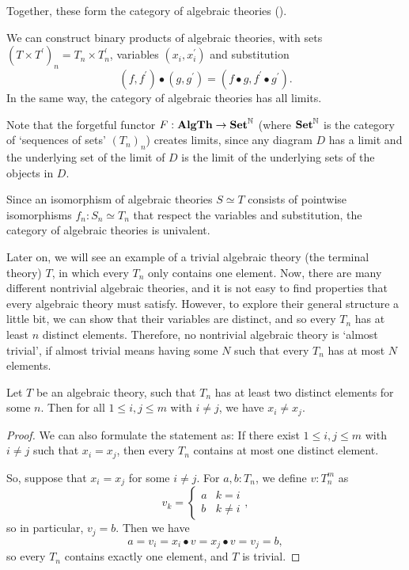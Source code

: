 Together, these form the category of algebraic theories \iindex{$ \AlgTh $} ().

\begin{lemma}\label{rem:algebraic-theory-limits}
  We can construct binary products of algebraic theories, with sets $ (T \times T^\prime)_n = T_n \times T^\prime_n $, variables $ (x_i, x^\prime_i) $ and substitution
  \[ (f, f^\prime) \bullet (g, g^\prime) = (f \bullet g, f^\prime \bullet g^\prime). \]
  In the same way, the category of algebraic theories has all limits.

  Note that the forgetful functor $ F: \mathbf{AlgTh} \to \mathbf{Set}^{\mathbb N} $ (where $ \mathbf{Set}^{\mathbb N} $ is the category of `sequences of sets' $ (T_n)_n $) creates limits, since any diagram $ D $ has a limit and the underlying set of the limit of $ D $ is the limit of the underlying sets of the objects in $ D $.
\end{lemma}

\begin{lemma}
  Since an isomorphism of algebraic theories $ S \simeq T $ consists of pointwise isomorphisms $ f_n: S_n \simeq T_n $ that respect the variables and substitution, the category of algebraic theories is univalent.
\end{lemma}

Later on, we will see an example of a trivial algebraic theory (the terminal theory) $ T $, in which every $ T_n $ only contains one element. Now, there are many different nontrivial algebraic theories, and it is not easy to find properties that every algebraic theory must satisfy. However, to explore their general structure a little bit, we can show that their variables are distinct, and so every $ T_n $ has at least $ n $ distinct elements. Therefore, no nontrivial algebraic theory is `almost trivial', if almost trivial means having some $ N $ such that every $ T_n $ has at most $ N $ elements.
\begin{lemma}\label{lem:nontrivial-algebraic-theory}
  Let $ T $ be an algebraic theory, such that $ T_n $ has at least two distinct elements for some $ n $. Then for all $ 1 \leq i, j \leq m $ with $ i \not = j $, we have $ x_i \not = x_j $.
\end{lemma}
\begin{proof}
  We can also formulate the statement as: If there exist $ 1 \leq i, j \leq m $ with $ i \not = j $ such that $ x_i = x_j $, then every $ T_n $ contains at most one distinct element.

  So, suppose that $ x_i = x_j $ for some $ i \not = j $. For $ a, b : T_n $, we define $ v : T_n^m $ as
  \[ v_k = \left\{\begin{array}{ll} a & k = i\\ b & k \not = i \end{array}\right., \]
  so in particular, $ v_j = b $. Then we have
  \[ a = v_i = x_i \bullet v = x_j \bullet v = v_j = b, \]
  so every $ T_n $ contains exactly one element, and $ T $ is trivial.
\end{proof}


